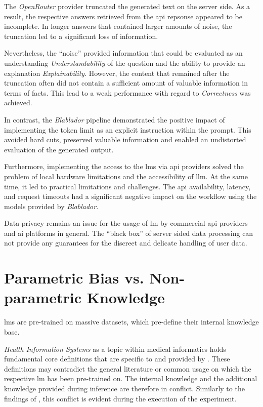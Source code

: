 The \textit{OpenRouter} provider truncated the generated text on the server side.
As a result, the respective answers retrieved from the \ac{api} repsonse appeared to be incomplete.
In longer answers that contained larger amounts of noise, the truncation led to a significant loss of information.
  
Nevertheless, the \enquote{noise} provided information that could be evaluated as an understanding \textit{Understandability} of the question and the ability to provide an explanation \textit{Explainability}.
However, the content that remained after the truncation often did not contain a sufficient amount of valuable information in terms of facts.
This lead to a weak performance with regard to \textit{Correctness} was achieved.
%

In contrast, the \textit{Blablador} pipeline demonstrated the positive impact of implementing the token limit as an explicit instruction within the prompt.
This avoided hard cuts, preserved valuable information and enabled an undistorted evaluation of the generated output.
%

Furthermore, implementing the access to the \acp{lm} via \ac{api} providers solved the problem of local hardware limitations and the accessibility of \ac{llm}.
At the same time, it led to practical limitations and challenges.
The \ac{api} availability, latency, and request timeouts had a significant negative impact on the workflow using the models provided by \textit{Blablador}.

Data privacy remains an issue for the usage of \ac{lm} by commercial \ac{api} providers and \ac{ai} platforms in general.
The \enquote{black box} of server sided data processing can not provide any guarantees for the discreet and delicate handling of user data.
%
\section{Parametric Bias vs. Non-parametric Knowledge}

\acp{lm} are pre-trained on massive datasets, which pre-define their internal knowledge base.

\textit{Health Information Systems} as a topic within medical informatics holds fundamental core definitions that are specific to and provided by \citet{bb2}.
These definitions may contradict the general literature or common usage on which the respective \ac{lm} has been pre-trained on.
The internal knowledge and the additional knowledge provided during inference are therefore in conflict.
Similarly to the findings of \citet{Paul_Keller}, this conflict is evident during the execution of the experiment.
%

